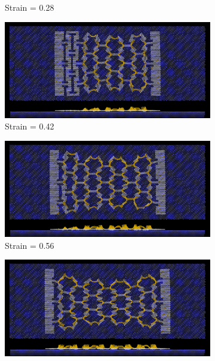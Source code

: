 \begin{figure}[H]
\begin{subfigure}[b]{0.49\textwidth}
        \caption{Strain = 0.28}
    \end{subfigure}
    \hfill
    \begin{subfigure}[b]{0.49\textwidth}
        \centering
        \includegraphics[width=\textwidth]{figures/baseline/contact_vs_stretch/honeycomb/hon_stretch0042.png}
        \caption{Strain = 0.42}
    \end{subfigure}
    \hfill
    \begin{subfigure}[b]{0.49\textwidth}
        \centering
        \includegraphics[width=\textwidth]{figures/baseline/contact_vs_stretch/honeycomb/hon_stretch0056.png}
        \caption{Strain = 0.56}
    \end{subfigure}
    \hfill
    \begin{subfigure}[b]{0.49\textwidth}
        \centering
        \includegraphics[width=\textwidth]{figures/baseline/contact_vs_stretch/honeycomb/hon_stretch0070.png}

\end{subfigure}
\end{figure}
